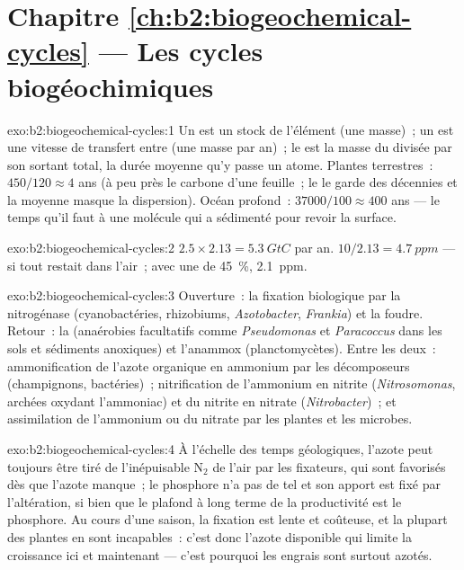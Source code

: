 \section*{Chapitre \ref{ch:b2:biogeochemical-cycles} --- Les cycles biogéochimiques}

\begin{solution}{exo:b2:biogeochemical-cycles:1}
Un  est un stock de l'élément (une masse)~; un  est une
vitesse de transfert entre  (une masse par an)~; le  est la masse du  divisée par son  sortant total,
la durée moyenne qu'y passe un atome. Plantes terrestres~: $450/120 \approx 4$ ans
(à peu près le carbone d'une feuille~; le  le garde des décennies et
la moyenne masque la dispersion). Océan profond~: $37000/100 \approx 400$ ans
--- le temps qu'il faut à une molécule qui a sédimenté pour revoir la
surface.
\end{solution}

\begin{solution}{exo:b2:biogeochemical-cycles:2}
$2.5\times 2.13 = \qty{5.3}{GtC}$ par an. $10/2.13 = \qty{4.7}{ppm}$
--- si tout restait dans l'air~; avec une  de
\qty{45}{\%}, \qty{2.1}{ppm}.
\end{solution}

\begin{solution}{exo:b2:biogeochemical-cycles:3}
Ouverture~: la fixation biologique par la nitrogénase (cyanobactéries,
rhizobiums, \emph{Azotobacter}, \emph{Frankia}) et la foudre. Retour~:
la  (anaérobies facultatifs comme \emph{Pseudomonas}
et \emph{Paracoccus} dans les sols et sédiments anoxiques) et l'anammox
(planctomycètes). Entre les deux~: ammonification de l'azote organique en
ammonium par les décomposeurs (champignons, bactéries)~; nitrification
de l'ammonium en nitrite (\emph{Nitrosomonas}, archées oxydant
l'ammoniac) et du nitrite en nitrate (\emph{Nitrobacter})~; et
assimilation de l'ammonium ou du nitrate par les plantes et les microbes.
\end{solution}

\begin{solution}{exo:b2:biogeochemical-cycles:4}
À l'échelle des temps géologiques, l'azote peut toujours être tiré de
l'inépuisable $\mathrm{N_2}$ de l'air par les fixateurs, qui sont favorisés
dès que l'azote manque~; le phosphore n'a pas de tel  et son
apport est fixé par l'altération, si bien que le plafond à long terme de
la productivité est le phosphore. Au cours d'une saison, la fixation est
lente et coûteuse, et la plupart des plantes en sont incapables~: c'est
donc l'azote disponible qui limite la croissance ici et maintenant ---
c'est pourquoi les engrais sont surtout azotés.
\end{solution}

